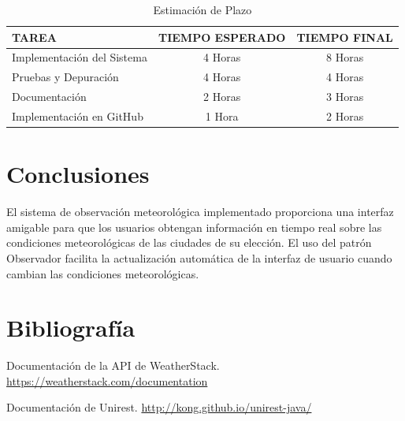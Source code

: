 \documentclass{article}
\begin{document}
\begin{table}[H]
    \centering
    \begin{tabular}{|l|c|c|}
        \hline
        \textbf{TAREA} & \textbf{TIEMPO ESPERADO} & \textbf{TIEMPO FINAL} \\
        \hline
        Implementación del Sistema & 4 Horas & 8 Horas \\
        Pruebas y Depuración & 4 Horas & 4 Horas \\
        Documentación & 2 Horas & 3 Horas \\
        Implementación en GitHub & 1 Hora & 2 Horas \\
        \hline
    \end{tabular}
    \caption{Estimación de Plazo}
    \label{tab:estimacion_plazo}
\end{table}

\section{Conclusiones}
El sistema de observación meteorológica implementado proporciona una interfaz amigable para que los usuarios obtengan información en tiempo real sobre las condiciones meteorológicas de las ciudades de su elección. El uso del patrón Observador facilita la actualización automática de la interfaz de usuario cuando cambian las condiciones meteorológicas.

\section{Bibliografía}
\begin{thebibliography}{99}
    Documentación de la API de WeatherStack. \url{https://weatherstack.com/documentation}

    Documentación de Unirest. \url{http://kong.github.io/unirest-java/}
\end{thebibliography}
\end{document}
